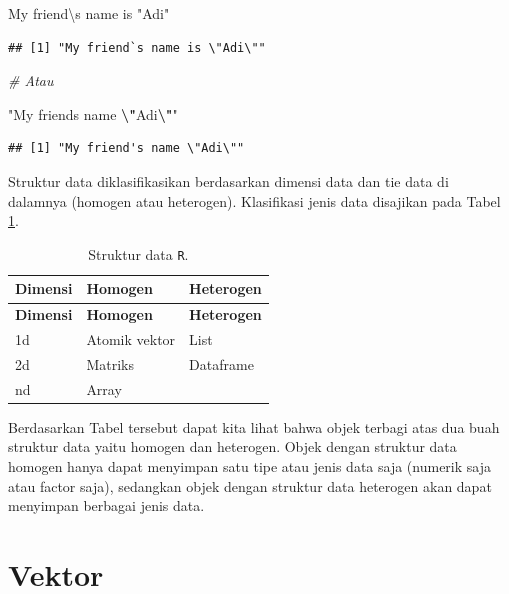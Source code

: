 \documentclass[
]{book}
\newenvironment{Shaded}{\begin{snugshade}}{\end{snugshade}}
\newcommand{\CommentTok}[1]{\textcolor[rgb]{0.56,0.35,0.01}{\textit{#1}}}
\newcommand{\SpecialCharTok}[1]{\textcolor[rgb]{0.81,0.36,0.00}{\textbf{#1}}}
\newcommand{\StringTok}[1]{\textcolor[rgb]{0.31,0.60,0.02}{#1}}
\theoremstyle{definition}
\theoremstyle{definition}
\theoremstyle{definition}
\theoremstyle{definition}
\theoremstyle{remark}
\begin{document}
\begin{Shaded}
\begin{Highlighting}[]
\StringTok{\textquotesingle{}My friend\textbackslash{}\textasciigrave{}s name is "Adi"\textquotesingle{}}
\end{Highlighting}
\end{Shaded}

\begin{verbatim}
## [1] "My friend`s name is \"Adi\""
\end{verbatim}

\begin{Shaded}
\begin{Highlighting}[]
\CommentTok{\# Atau}

\StringTok{"My friend\textquotesingle{}s name }\SpecialCharTok{\textbackslash{}"}\StringTok{Adi}\SpecialCharTok{\textbackslash{}"}\StringTok{"}
\end{Highlighting}
\end{Shaded}

\begin{verbatim}
## [1] "My friend's name \"Adi\""
\end{verbatim}

Struktur data diklasifikasikan berdasarkan dimensi data dan tie data di dalamnya (homogen atau heterogen). Klasifikasi jenis data disajikan pada Tabel \ref{tab:strukturdata}.

\begin{longtable}[]{@{}lll@{}}
\caption{\label{tab:strukturdata} Struktur data \texttt{R}.}\tabularnewline
\toprule\noalign{}
\textbf{Dimensi} & \textbf{Homogen} & \textbf{Heterogen} \\
\midrule\noalign{}
\endfirsthead
\toprule\noalign{}
\textbf{Dimensi} & \textbf{Homogen} & \textbf{Heterogen} \\
\midrule\noalign{}
\endhead
\bottomrule\noalign{}
\endlastfoot
1d & Atomik vektor & List \\
2d & Matriks & Dataframe \\
nd & Array & \\
\end{longtable}

Berdasarkan Tabel tersebut dapat kita lihat bahwa objek terbagi atas dua buah struktur data yaitu homogen dan heterogen. Objek dengan struktur data homogen hanya dapat menyimpan satu tipe atau jenis data saja (numerik saja atau factor saja), sedangkan objek dengan struktur data heterogen akan dapat menyimpan berbagai jenis data.

\hypertarget{vector}{%
\section{Vektor}\label{vector}}
\end{document}
